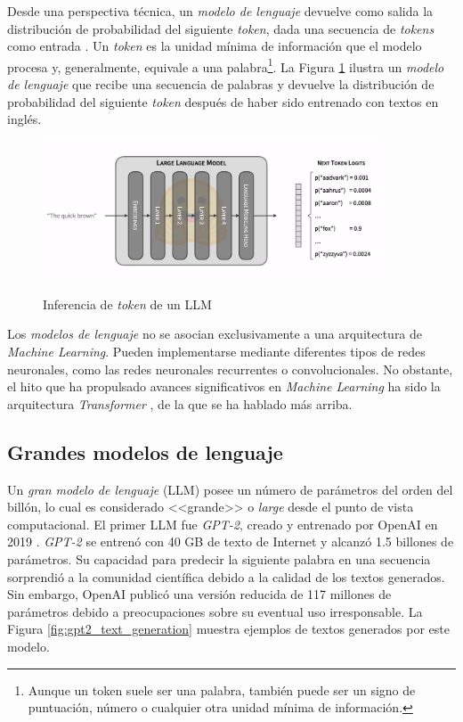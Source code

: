 Desde una perspectiva técnica, un \textit{modelo de lenguaje} devuelve como salida la distribución de probabilidad del siguiente \textit{token}, dada una secuencia de \textit{tokens} como entrada \citep{GenerationLLMs}. Un \textit{token} es la unidad mínima de información que el modelo procesa y, generalmente, equivale a una palabra\footnote{Aunque un token suele ser una palabra, también puede ser un signo de puntuación, número o cualquier otra unidad mínima de información.}. La Figura \ref{fig:llm_generation} ilustra un \textit{modelo de lenguaje} que recibe una secuencia de palabras y devuelve la distribución de probabilidad del siguiente \textit{token} después de haber sido entrenado con textos en inglés.

\begin{figure}[H]
    \caption[Inferencia de \textit{token} de un LLM]{Inferencia de \textit{token} de un LLM}
    \centering
    \includegraphics[width=0.9\textwidth]{./figuras/LLM_predice_token.png}
    \label{fig:llm_generation}
\end{figure}

Los \textit{modelos de lenguaje} no se asocian exclusivamente a una arquitectura de \textit{Machine Learning}. Pueden implementarse mediante diferentes tipos de redes neuronales, como las redes neuronales recurrentes o convolucionales. No obstante, el hito que ha propulsado avances significativos en \textit{Machine Learning} ha sido la arquitectura \textit{Transformer} \citep{vaswaniAttentionAllYou2017}, de la que se ha hablado más arriba.

\subsection{Grandes modelos de lenguaje}

Un \textit{gran modelo de lenguaje} (LLM) posee un número de parámetros del orden del billón, lo cual es considerado <<grande>> o \textit{large} desde el punto de vista computacional. El primer LLM fue \textit{GPT-2}, creado y entrenado por OpenAI en 2019 \citep{radfordLanguageModelsAre2019a}. \textit{GPT-2} se entrenó con 40 GB de texto de Internet y alcanzó 1.5 billones de parámetros. Su capacidad para predecir la siguiente palabra en una secuencia sorprendió a la comunidad científica debido a la calidad de los textos generados. Sin embargo, OpenAI publicó una versión reducida de 117 millones de parámetros debido a preocupaciones sobre su eventual uso irresponsable. La Figura \ref{fig:gpt2_text_generation} muestra ejemplos de textos generados por este modelo.

